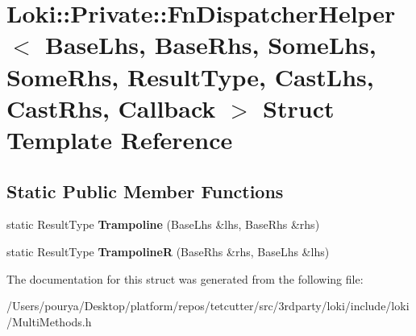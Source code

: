\hypertarget{structLoki_1_1Private_1_1FnDispatcherHelper}{}\section{Loki\+:\+:Private\+:\+:Fn\+Dispatcher\+Helper$<$ Base\+Lhs, Base\+Rhs, Some\+Lhs, Some\+Rhs, Result\+Type, Cast\+Lhs, Cast\+Rhs, Callback $>$ Struct Template Reference}
\label{structLoki_1_1Private_1_1FnDispatcherHelper}
\subsection*{Static Public Member Functions}
\begin{DoxyCompactItemize}
\item 
\hypertarget{structLoki_1_1Private_1_1FnDispatcherHelper_a4b7560db2d59d8e027fa83e2a76d21c0}{}static Result\+Type {\bfseries Trampoline} (Base\+Lhs \&lhs, Base\+Rhs \&rhs)\label{structLoki_1_1Private_1_1FnDispatcherHelper_a4b7560db2d59d8e027fa83e2a76d21c0}

\item 
\hypertarget{structLoki_1_1Private_1_1FnDispatcherHelper_a7a63b0f09a5e61736375a37e66c0cef1}{}static Result\+Type {\bfseries Trampoline\+R} (Base\+Rhs \&rhs, Base\+Lhs \&lhs)\label{structLoki_1_1Private_1_1FnDispatcherHelper_a7a63b0f09a5e61736375a37e66c0cef1}

\end{DoxyCompactItemize}


The documentation for this struct was generated from the following file\+:\begin{DoxyCompactItemize}
\item 
/\+Users/pourya/\+Desktop/platform/repos/tetcutter/src/3rdparty/loki/include/loki/Multi\+Methods.\+h\end{DoxyCompactItemize}
